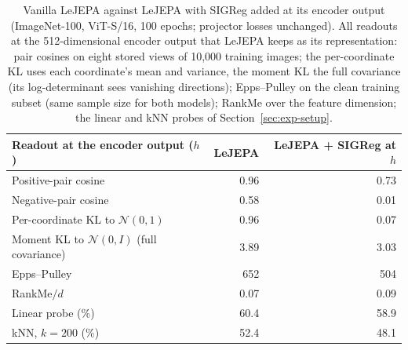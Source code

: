 \begin{table}[h]
\centering
\small
\begin{tabular}{lrr}
\toprule
Readout at the encoder output ($h$) & LeJEPA & LeJEPA + SIGReg at $h$ \\
\midrule
Positive-pair cosine & 0.96 & 0.73 \\
Negative-pair cosine & 0.58 & 0.01 \\
Per-coordinate KL to $\mathcal N(0,1)$ & 0.96 & 0.07 \\
Moment KL to $\mathcal N(0,I)$ (full covariance) & 3.89 & 3.03 \\
Epps--Pulley & 652 & 504 \\
RankMe$/d$ & 0.07 & 0.09 \\
Linear probe (\%) & 60.4 & 58.9 \\
kNN, $k=200$ (\%) & 52.4 & 48.1 \\
\bottomrule
\end{tabular}
\caption{Vanilla LeJEPA against LeJEPA with SIGReg added at its encoder output (ImageNet-100, ViT-S/16, 100 epochs; projector losses unchanged). All readouts at the 512-dimensional encoder output that LeJEPA keeps as its representation: pair cosines on eight stored views of 10{,}000 training images; the per-coordinate KL uses each coordinate's mean and variance, the moment KL the full covariance (its log-determinant sees vanishing directions); Epps--Pulley on the clean training subset (same sample size for both models); RankMe over the feature dimension; the linear and kNN probes of Section~\ref{sec:exp-setup}.}
\label{tab:lejepa-sigreg}
\end{table}

